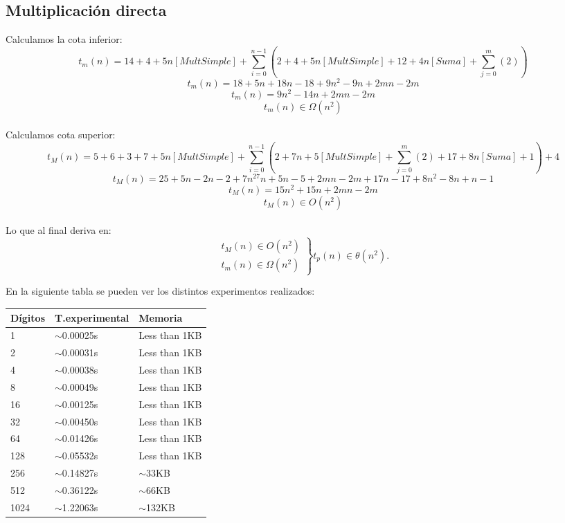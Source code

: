 \documentclass{article}
\begin{document}
\subsection{Multiplicación directa}
Calculamos la cota inferior:
$$t_m(n)=14+4+5n[Mult Simple]+\sum_{i=0}^{n-1} (2+4+5 n[MultSimple]+12+4 n[Suma]+ \sum_{j=0}^{m} (2))$$
$$t_m(n)=18+5n+18n-18+9n^2-9n+2mn-2m$$
$$t_m(n)=9n^2-14n+2mn-2m$$
$$t_m(n)\in\Omega(n^2)$$
\\
Calculamos cota superior:
$$t_M(n)=5+6+3+7+5n[MultSimple]+ \sum_{i=0}^{n-1}(2+7n+5[MultSimple]+\sum_{j=0}^{m}(2)+17+8n[Suma]+1)+4$$
$$t_M(n)=25+5n-2n-2+7n^27n+5n-5+2mn-2m+17n-17+8n^2-8n+n-1$$
$$t_M(n)=15n^2+15n+2mn-2m$$
$$t_M(n)\in O(n^2)$$
\\
Lo que al final deriva en:
$$
	\left.
        \begin{array}{ll}
           	t_M(n)\in O(n^2) \\
			t_m(n)\in\Omega(n^2)
        \end{array}
    \right\} t_p(n)\in \theta(n^2).
$$
\newpage
\begin{center}
En la siguiente tabla se pueden ver los distintos experimentos realizados: 
\end{center}
\label{md-table}
\begin{adjustbox}{width=0.5\textwidth,center=\textwidth}
\begin{tabular}{|l|l|l|}
\hline
{Dígitos} 					   & {T.experimental} 					   & {Memoria} 						\\ \hline
1                              & $\sim$0.00025s                        & Less than 1KB                  \\ \hline
2                              & $\sim$0.00031s                        & Less than 1KB                  \\ \hline
4                              & $\sim$0.00038s                        & Less than 1KB                  \\ \hline
8                              & $\sim$0.00049s                        & Less than 1KB                  \\ \hline
16                             & $\sim$0.00125s                        & Less than 1KB                  \\ \hline
32                             & $\sim$0.00450s                        & Less than 1KB                  \\ \hline
64                             & $\sim$0.01426s                        & Less than 1KB                  \\ \hline
128                            & $\sim$0.05532s                        & Less than 1KB                  \\ \hline
256                            & $\sim$0.14827s                        & $\sim$33KB                     \\ \hline
512                            & $\sim$0.36122s                        & $\sim$66KB                     \\ \hline
1024                           & $\sim$1.22063s                        & $\sim$132KB                    \\ \hline
\end{tabular}
\end{adjustbox}
\end{document}
